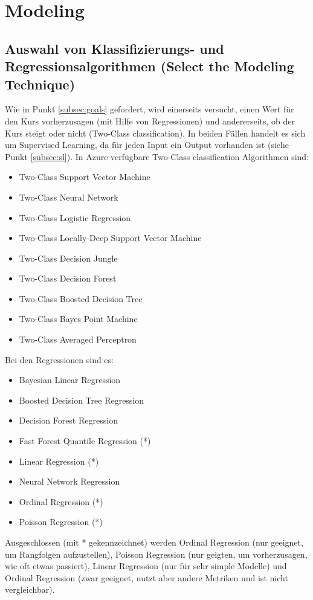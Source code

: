 


\section{Modeling}\label{sec:p4}
\subsection{Auswahl von Klassifizierungs- und Regressionsalgorithmen (Select the Modeling Technique)}
Wie in Punkt \ref{subsec:goals} gefordert, wird einerseits versucht, einen Wert für den Kurs vorherzusagen (mit Hilfe von Regressionen) und andererseits, ob der Kurs steigt oder nicht (Two-Class classification). In beiden Fällen handelt es sich um Supervised Learning, da für jeden Input ein Output vorhanden ist (siehe Punkt \ref{subsec:sl}).
In Azure verfügbare Two-Class classification Algorithmen sind:
\begin{itemize}
\item Two-Class Support Vector Machine
\item Two-Class Neural Network
\item Two-Class Logistic Regression
\item Two-Class Locally-Deep Support Vector Machine
\item Two-Class Decision Jungle
\item Two-Class Decision Forest
\item Two-Class Boosted Decision Tree
\item Two-Class Bayes Point Machine
\item Two-Class Averaged Perceptron
\end{itemize}
Bei den Regressionen sind es:
\begin{itemize}
\item Bayesian Linear Regression
\item Boosted Decision Tree Regression
\item Decision Forest Regression
\item Fast Forest Quantile Regression (*)
\item Linear Regression (*)
\item Neural Network Regression
\item Ordinal Regression (*)
\item Poisson Regression (*)
\end{itemize}
Ausgeschlossen (mit * gekennzeichnet) werden Ordinal Regression (nur geeignet, um Rangfolgen aufzustellen), Poisson Regression (nur geigten, um vorherzusagen, wie oft etwas passiert), Linear Regression (nur für sehr simple Modelle) und Ordinal Regression (zwar geeignet, nutzt aber andere Metriken und ist nicht vergleichbar).
